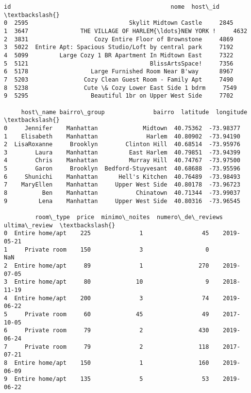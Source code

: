 \documentclass[11pt]{article}
\makeatletter
\newcommand{\boxspacing}{\kern\kvtcb@left@rule\kern\kvtcb@boxsep}
\newcommand{\prompt}[4]{
        {\ttfamily\llap{{\color{#2}[#3]:\hspace{3pt}#4}}\vspace{-\baselineskip}}
    }
\makeatother
\begin{document}
            \begin{tcolorbox}[breakable, size=fbox, boxrule=.5pt, pad at break*=1mm, opacityfill=0]
\prompt{Out}{outcolor}{214}{\boxspacing}
\begin{Verbatim}[commandchars=\\\{\}]
     id                                              nome  host\_id  \textbackslash{}
0  2595                             Skylit Midtown Castle     2845
1  3647               THE VILLAGE OF HARLEM{\ldots}NEW YORK !     4632
2  3831                   Cozy Entire Floor of Brownstone     4869
3  5022  Entire Apt: Spacious Studio/Loft by central park     7192
4  5099         Large Cozy 1 BR Apartment In Midtown East     7322
5  5121                                   BlissArtsSpace!     7356
6  5178                  Large Furnished Room Near B'way      8967
7  5203                Cozy Clean Guest Room - Family Apt     7490
8  5238                Cute \& Cozy Lower East Side 1 bdrm     7549
9  5295                  Beautiful 1br on Upper West Side     7702

     host\_name bairro\_group              bairro  latitude  longitude  \textbackslash{}
0     Jennifer    Manhattan             Midtown  40.75362  -73.98377
1    Elisabeth    Manhattan              Harlem  40.80902  -73.94190
2  LisaRoxanne     Brooklyn        Clinton Hill  40.68514  -73.95976
3        Laura    Manhattan         East Harlem  40.79851  -73.94399
4        Chris    Manhattan         Murray Hill  40.74767  -73.97500
5        Garon     Brooklyn  Bedford-Stuyvesant  40.68688  -73.95596
6     Shunichi    Manhattan      Hell's Kitchen  40.76489  -73.98493
7    MaryEllen    Manhattan     Upper West Side  40.80178  -73.96723
8          Ben    Manhattan           Chinatown  40.71344  -73.99037
9         Lena    Manhattan     Upper West Side  40.80316  -73.96545

         room\_type  price  minimo\_noites  numero\_de\_reviews ultima\_review  \textbackslash{}
0  Entire home/apt    225              1                 45    2019-05-21
1     Private room    150              3                  0           NaN
2  Entire home/apt     89              1                270    2019-07-05
3  Entire home/apt     80             10                  9    2018-11-19
4  Entire home/apt    200              3                 74    2019-06-22
5     Private room     60             45                 49    2017-10-05
6     Private room     79              2                430    2019-06-24
7     Private room     79              2                118    2017-07-21
8  Entire home/apt    150              1                160    2019-06-09
9  Entire home/apt    135              5                 53    2019-06-22


\end{Verbatim}
\end{tcolorbox}
\end{document}

